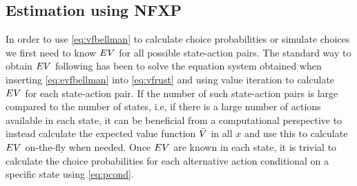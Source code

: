 

\subsection{Estimation using NFXP}
In order to use \eqref{eq:vfbellman} to calculate choice probabilities or simulate choices we first need to know $EV$ for all possible state-action pairs.  
The standard way to obtain $EV$ following \citet{Rust87} has been to solve the equation system obtained when inserting \eqref{eq:evfbellman} into \eqref{eq:vfrust} and using value iteration to calculate $EV$ for each state-action pair.   
If the number of such state-action pairs is large compared to the number of states, i.e, if there is a large number of actions available in each state, it can be beneficial from a computational perspective to instead calculate the expected value function $\bar{V}$ in all $x$ and use this to calculate $EV$ on-the-fly when needed. Once $EV$ are known in each state, it is trivial to calculate the choice probabilities for each alternative action conditional on a specific state using \eqref{eq:pcond}.
